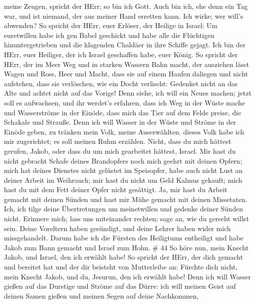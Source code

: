 meine Zeugen, spricht der HErr; so bin ich Gott.  Auch bin
ich, ehe denn ein Tag war, und ist niemand, der aus meiner Hand erretten
kann. Ich wirke; wer will's abwenden?  So spricht der HErr,
euer Erlöser, der Heilige in Israel: Um euretwillen habe ich gen Babel
geschickt und habe alle die Flüchtigen hinuntergetrieben und die
klagenden Chaldäer in ihre Schiffe gejagt.  Ich bin der
HErr, euer Heiliger, der ich Israel geschaffen habe, euer König.
 So spricht der HErr, der im Meer Weg und in starken
Wassern Bahn macht,  der ausziehen lässt Wagen und Ross,
Heer und Macht, dass sie auf einem Haufen daliegen und nicht aufstehen,
dass sie verlöschen, wie ein Docht verlischt:  Gedenket
nicht an das Alte und achtet nicht auf das Vorige!  Denn
siehe, ich will ein Neues machen; jetzt soll es aufwachsen, und ihr
werdet's erfahren, dass ich Weg in der Wüste mache und Wasserströme in
der Einöde,  dass mich das Tier auf dem Felde preise, die
Schakale und Strauße. Denn ich will Wasser in der Wüste und Ströme in
der Einöde geben, zu tränken mein Volk, meine Auserwählten.
 dieses Volk habe ich mir zugerichtet; es soll meinen Ruhm
erzählen.  Nicht, dass du mich hättest gerufen, Jakob, oder
dass du um mich gearbeitet hättest, Israel.  Mir hast du
nicht gebracht Schafe deines Brandopfers noch mich geehrt mit deinen
Opfern; mich hat deines Dienstes nicht gelüstet im Speisopfer, habe auch
nicht Lust an deiner Arbeit im Weihrauch;  mir hast du
nicht um Geld Kalmus gekauft; mich hast du mit dem Fett deiner Opfer
nicht gesättigt. Ja, mir hast du Arbeit gemacht mit deinen Sünden und
hast mir Mühe gemacht mit deinen Missetaten.  Ich, ich
tilge deine Übertretungen um meinetwillen und gedenke deiner Sünden
nicht.  Erinnere mich; lass uns miteinander rechten; sage
an, wie du gerecht willst sein.  Deine Voreltern haben
gesündigt, und deine Lehrer haben wider mich missgehandelt.
 Darum habe ich die Fürsten des Heiligtums entheiligt und
habe Jakob zum Bann gemacht und Israel zum Hohn. \# 44  So
höre nun, mein Knecht Jakob, und Israel, den ich erwählt habe!
 So spricht der HErr, der dich gemacht und bereitet hat und
der dir beisteht von Mutterleibe an: Fürchte dich nicht, mein Knecht
Jakob, und du, Jesurun, den ich erwählt habe!  Denn ich will
Wasser gießen auf das Durstige und Ströme auf das Dürre: ich will meinen
Geist auf deinen Samen gießen und meinen Segen auf deine Nachkommen,
